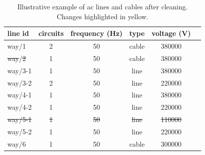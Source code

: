 \documentclass[fleqn,10pt]{wlscirep}
\providecommand{\DIFaddtex}[1]{{\protect\color{blue}\uwave{#1}}} %
\providecommand{\DIFdeltex}[1]{{\protect\color{red}\sout{#1}}}                      %
\providecommand{\DIFaddFL}[1]{\DIFadd{#1}} %
\providecommand{\DIFdelFL}[1]{\DIFdel{#1}} %
\providecommand{\DIFaddbeginFL}{} %
\providecommand{\DIFaddendFL}{} %
\providecommand{\DIFdelbeginFL}{} %
\providecommand{\DIFdelendFL}{} %
\providecommand{\DIFadd}[1]{\texorpdfstring{\DIFaddtex{#1}}{#1}} %
\providecommand{\DIFdel}[1]{\texorpdfstring{\DIFdeltex{#1}}{}} %
\begin{document}
\begin{table}[!htbp]
    \centering
    \begin{tabular}{|l|c|c|c|c|c|}
    \hline
    \textbf{line id} & \textbf{circuits} & \textbf{frequency (Hz)} & \textbf{type} & \textbf{voltage (V)} \\
    \hline
    way/1 & 2 & 50 & cable & \SI{380000}{} \\
    \hline
    \DIFdelbeginFL \DIFdelFL{way}\DIFdelendFL \DIFaddbeginFL \DIFaddFL{relation}\DIFaddendFL /\DIFdelbeginFL \DIFdelFL{2 }\DIFdelendFL \DIFaddbeginFL \DIFaddFL{1 }\DIFaddendFL & \cellcolor{yellow!50}1 & 50 & cable & \SI{380000}{} \\
    \hline
    way/3-1 & \cellcolor{yellow!50}1 & 50 & line & \cellcolor{yellow!50}\SI{380000}{} \\
    \hline
    way/3-2 & \cellcolor{yellow!50}2 & 50 & line & \cellcolor{yellow!50}\SI{220000}{} \\
    \hline
    way/4-1 & \cellcolor{yellow!50}1 & \cellcolor{yellow!50}50 & line & \cellcolor{yellow!50}\SI{380000}{} \\
    \hline
    way/4-2 & \cellcolor{yellow!50}1 & \cellcolor{yellow!50}50 & line & \cellcolor{yellow!50}\SI{220000}{} \\
    \hline
    \sout{way/5-1} & \cellcolor{yellow!50}\sout{1} & \sout{50} & \sout{line} & \cellcolor{yellow!50}\sout{\SI{110000}{}} \\
    \hline
    way/5-2 & \cellcolor{yellow!50}1 & 50 & line & \cellcolor{yellow!50}\SI{220000}{} \\
    \hline
    way/6 & \cellcolor{yellow!50}1 & 50 & cable & \SI{300000}{}\\
    \hline
    \end{tabular}
    \caption{Illustrative example of \acrshort{ac} lines and cables after cleaning. Changes highlighted in yellow.}
    \label{tab:aclines_example2} 
\end{table}
\end{document}
